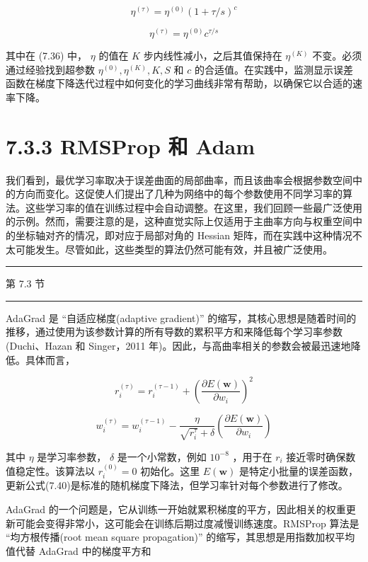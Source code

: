 \documentclass[10pt]{report}
\newcommand{\HRule}{\begin{center}\rule{0.9\linewidth}{0.2mm}\end{center}}
\begin{document}
\[
{\eta }^{\left( \tau \right) } = {\eta }^{\left( 0\right) }{\left( 1 + \tau /s\right) }^{c} \tag{7.37}
\]

\[
{\eta }^{\left( \tau \right) } = {\eta }^{\left( 0\right) }{c}^{\tau /s} \tag{7.38}
\]

其中在 (7.36) 中， \(\eta\) 的值在 \(K\) 步内线性减小，之后其值保持在 \({\eta }^{\left( K\right) }\) 不变。必须通过经验找到超参数 \({\eta }^{\left( 0\right) },{\eta }^{\left( K\right) },K,S\) 和 \(c\) 的合适值。在实践中，监测显示误差函数在梯度下降迭代过程中如何变化的学习曲线非常有帮助，以确保它以合适的速率下降。

\section*{7.3.3 RMSProp 和 Adam}

我们看到，最优学习率取决于误差曲面的局部曲率，而且该曲率会根据参数空间中的方向而变化。这促使人们提出了几种为网络中的每个参数使用不同学习率的算法。这些学习率的值在训练过程中会自动调整。在这里，我们回顾一些最广泛使用的示例。然而，需要注意的是，这种直觉实际上仅适用于主曲率方向与权重空间中的坐标轴对齐的情况，即对应于局部对角的 Hessian 矩阵，而在实践中这种情况不太可能发生。尽管如此，这些类型的算法仍然可能有效，并且被广泛使用。

\HRule

第 7.3 节

\HRule

AdaGrad 是 “自适应梯度(adaptive gradient)” 的缩写，其核心思想是随着时间的推移，通过使用为该参数计算的所有导数的累积平方和来降低每个学习率参数(Duchi、Hazan 和 Singer，2011 年)。因此，与高曲率相关的参数会被最迅速地降低。具体而言，

\[
{r}_{i}^{\left( \tau \right) } = {r}_{i}^{\left( \tau  - 1\right) } + {\left( \frac{\partial E\left( \mathbf{w}\right) }{\partial {w}_{i}}\right) }^{2} \tag{7.39}
\]

\[
{w}_{i}^{\left( \tau \right) } = {w}_{i}^{\left( \tau  - 1\right) } - \frac{\eta }{\sqrt{{r}_{i}^{\tau }} + \delta }\left( \frac{\partial E\left( \mathbf{w}\right) }{\partial {w}_{i}}\right)  \tag{7.40}
\]

其中 \(\eta\) 是学习率参数， \(\delta\) 是一个小常数，例如 \({10}^{-8}\) ，用于在 \({r}_{i}\) 接近零时确保数值稳定性。该算法以 \({r}_{i}^{\left( 0\right) } = 0\) 初始化。这里 \(E\left( \mathbf{w}\right)\) 是特定小批量的误差函数，更新公式(7.40)是标准的随机梯度下降法，但学习率针对每个参数进行了修改。

AdaGrad 的一个问题是，它从训练一开始就累积梯度的平方，因此相关的权重更新可能会变得非常小，这可能会在训练后期过度减慢训练速度。RMSProp 算法是 “均方根传播(root mean square propagation)” 的缩写，其思想是用指数加权平均值代替 AdaGrad 中的梯度平方和
\end{document}
